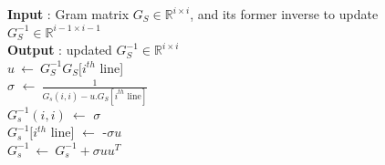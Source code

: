 \documentclass{ipol}
\begin{document}
\begin{algorithm}[H]
\caption{LARS algorithm - Mairal Version {\color{red} computeLars} - LOOP }

\end{algorithm}
\newpage

\begin{algorithm}[H]

\SetLine
\textbf{Input} : Gram matrix $G_S \in \mathbb{R}^{i \times i}$, and its former inverse to update $G_S^{-1}\in \mathbb{R}^{i-1 \times i-1}$\\
\textbf{Output} : updated  $G_S^{-1}\in \mathbb{R}^{i \times i}$\\
$u \ \leftarrow \ G_S^{-1} G_S[i^{th}$ line]\\
$\sigma$ $\leftarrow \ \frac{1}{G_s(i,i) - u.G_S[i^{th} \text{ line}]}$\\
$G_s^{-1}(i,i)\ \leftarrow$ $\sigma$\\
$G_s^{-1}[i^{th}$ line] $\leftarrow$ -$\sigma u$\\
\Return $G_s^{-1} \ \leftarrow \ G_s^{-1}+\sigma u u^T$\\
\caption{Update invert algorithm {\color{red} updateGram} {\color{blue} Marc: Algo correspondant, mais \`a valider.}}

\end{algorithm}
\end{document}
